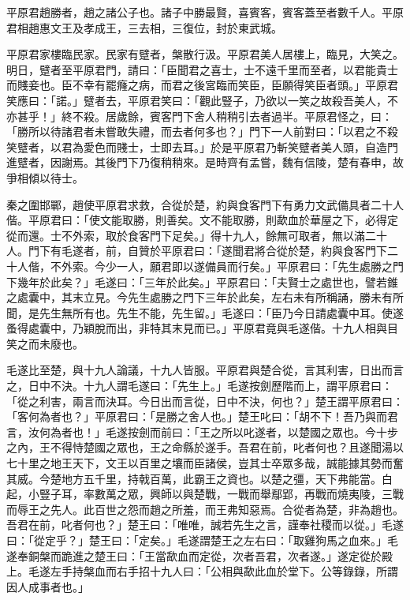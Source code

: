 
\begin{pinyinscope}
平原君趙勝者，趙之諸公子也。諸子中勝最賢，喜賓客，賓客蓋至者數千人。平原君相趙惠文王及孝成王，三去相，三復位，封於東武城。

平原君家樓臨民家。民家有躄者，槃散行汲。平原君美人居樓上，臨見，大笑之。明日，躄者至平原君門，請曰：「臣聞君之喜士，士不遠千里而至者，以君能貴士而賤妾也。臣不幸有罷癃之病，而君之後宮臨而笑臣，臣願得笑臣者頭。」平原君笑應曰：「諾。」躄者去，平原君笑曰：「觀此豎子，乃欲以一笑之故殺吾美人，不亦甚乎！」終不殺。居歲餘，賓客門下舍人稍稍引去者過半。平原君怪之，曰：「勝所以待諸君者未嘗敢失禮，而去者何多也？」門下一人前對曰：「以君之不殺笑躄者，以君為愛色而賤士，士即去耳。」於是平原君乃斬笑躄者美人頭，自造門進躄者，因謝焉。其後門下乃復稍稍來。是時齊有孟嘗，魏有信陵，楚有春申，故爭相傾以待士。

秦之圍邯鄲，趙使平原君求救，合從於楚，約與食客門下有勇力文武備具者二十人偕。平原君曰：「使文能取勝，則善矣。文不能取勝，則歃血於華屋之下，必得定從而還。士不外索，取於食客門下足矣。」得十九人，餘無可取者，無以滿二十人。門下有毛遂者，前，自贊於平原君曰：「遂聞君將合從於楚，約與食客門下二十人偕，不外索。今少一人，願君即以遂備員而行矣。」平原君曰：「先生處勝之門下幾年於此矣？」毛遂曰：「三年於此矣。」平原君曰：「夫賢士之處世也，譬若錐之處囊中，其末立見。今先生處勝之門下三年於此矣，左右未有所稱誦，勝未有所聞，是先生無所有也。先生不能，先生留。」毛遂曰：「臣乃今日請處囊中耳。使遂蚤得處囊中，乃穎脫而出，非特其末見而已。」平原君竟與毛遂偕。十九人相與目笑之而未廢也。

毛遂比至楚，與十九人論議，十九人皆服。平原君與楚合從，言其利害，日出而言之，日中不決。十九人謂毛遂曰：「先生上。」毛遂按劍歷階而上，謂平原君曰：「從之利害，兩言而決耳。今日出而言從，日中不決，何也？」楚王謂平原君曰：「客何為者也？」平原君曰：「是勝之舍人也。」楚王叱曰：「胡不下！吾乃與而君言，汝何為者也！」毛遂按劍而前曰：「王之所以叱遂者，以楚國之眾也。今十步之內，王不得恃楚國之眾也，王之命縣於遂手。吾君在前，叱者何也？且遂聞湯以七十里之地王天下，文王以百里之壤而臣諸侯，豈其士卒眾多哉，誠能據其勢而奮其威。今楚地方五千里，持戟百萬，此霸王之資也。以楚之彊，天下弗能當。白起，小豎子耳，率數萬之眾，興師以與楚戰，一戰而舉鄢郢，再戰而燒夷陵，三戰而辱王之先人。此百世之怨而趙之所羞，而王弗知惡焉。合從者為楚，非為趙也。吾君在前，叱者何也？」楚王曰：「唯唯，誠若先生之言，謹奉社稷而以從。」毛遂曰：「從定乎？」楚王曰：「定矣。」毛遂謂楚王之左右曰：「取雞狗馬之血來。」毛遂奉銅槃而跪進之楚王曰：「王當歃血而定從，次者吾君，次者遂。」遂定從於殿上。毛遂左手持槃血而右手招十九人曰：「公相與歃此血於堂下。公等錄錄，所謂因人成事者也。」


\end{pinyinscope}
